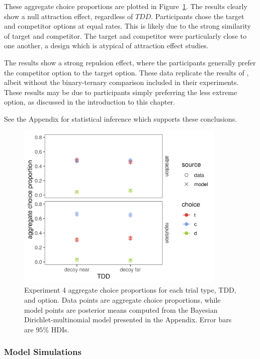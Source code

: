 These aggregate choice proportions are plotted in Figure~\ref{fig:bayes_choice_model_data_plot}. The results clearly show a null attraction effect, regardless of $TDD$. Participants chose the target and competitor options at equal rates. This is likely due to the strong similarity of target and competitor. The target and competitor were particularly close to one another, a design which is atypical of attraction effect studies. 

The results show a strong repulsion effect, where the participants generally prefer the competitor option to the target option. These data replicate the results of \textcite{banerjeeFactorsThatPromote2024}, albeit without the binary-ternary comparison included in their experiments. These results may be due to participants simply preferring the less extreme option, as discussed in the introduction to this chapter.

See the Appendix for statistical inference which supports these conclusions.

\begin{figure}
    \includegraphics[scale=.5,width=100mm]{figures/bayes_choice_model_data_plot.jpeg}
    \caption{Experiment 4 aggregate choice proportions for each trial type, TDD, and option. Data points are aggregate choice proportions, while model points are posterior means computed from the Bayesian Dirichlet-multinomial model presented in the Appendix. Error bars are $95\%$ HDIs.}
    \label{fig:bayes_choice_model_data_plot}
\end{figure}

\subsubsection{Model Simulations}

